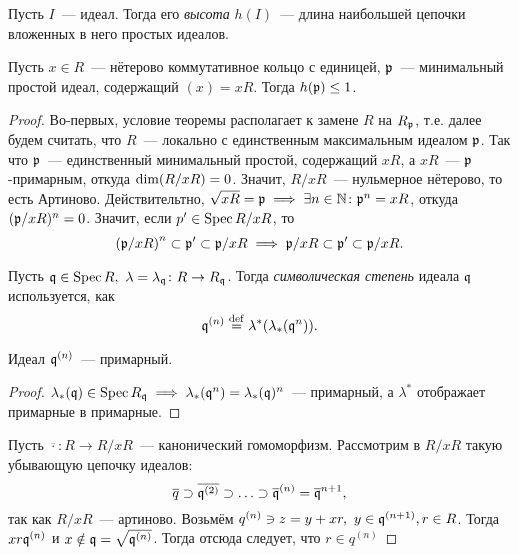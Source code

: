 	\begin{definition} 
		Пусть $I$~--- идеал. Тогда  его \emph{высота} $h(I)$~--- длина наибольшей цепочки вложенных в него простых идеалов. 
	\end{definition}

	\begin{theorem}
	 	Пусть $x \in R$~--- нётерово коммутативное кольцо с единицей, $\fp$~--- минимальный простой идеал, содержащий $(x) = xR$. Тогда $h(\fp) \le 1$. 	 
	 \end{theorem}  
	 \begin{proof}
	 	Во-первых, условие теоремы располагает к замене $R$ на $R_{\fp}$, т.е. далее будем считать, что $R$~--- локально с единственным максимальным идеалом $\fp$. Так что $\fp$~--- единственный минимальный простой, содержащий $xR$, а $xR$~--- $\fp$-примарным, откуда $\dim\lr*{R/xR} = 0$. Значит, $R/xR$~--- нульмерное нётерово, то есть Артиново. Действительтно, $\sqrt{xR} = \fp \implies \exists n \in \N \colon \fp^n = xR$, откуда $(\fp/xR)^n = 0$. Значит, если $p' \in \Spec{R/xR}$, то 
	 	\[
	 		\lr*{\fp/xR}^n \subset \fp' \subset \fp/xR \implies \fp/xR \subset \fp' \subset \fp/xR.
	 	\]

	 	\begin{definition} 
	 		Пусть $\fq \in \Spec{R}, \ \lambda = \lambda_{\fq}\colon R \to R_{\fq}$. Тогда \emph{символическая степень} идеала $\fq$ используется, как 
	 		\[
	 			\fq^{(n)} \eqdef \lambda^*\lr*{\lambda_*(\fq^n)}.
	 		\]
	 	\end{definition}

	 	\begin{lemma} 
	 		Идеал $\fq^{(n)}$~--- примарный. 
	 	\end{lemma}

	 	\begin{proof}
	 		$\lambda_{*}(\fq) \in \Spec{R_{\fq}} \implies \lambda_{*}(\fq^n) = \lambda_{*}(\fq)^n$~--- примарный, а $\lambda^*$ отображает примарные в примарные.  
	 	\end{proof}

	 	Пусть $\overline{\cdot}\colon R \to R/xR$~--- канонический гомоморфизм. Рассмотрим в $R/xR$ такую убывающую цепочку идеалов: 
	 	\[
	 		\overline{q} \supset \overline{\fq^{(2)}} \supset \ldots \supset \overline{\fq}^{(n)} = \overline{\fq}^{n + 1},
	 	\]
	 	так как $R/xR$~--- артиново. Возьмём $q^{(n)} \ni z = y + xr, \ y \in \fq^{(n + 1)}, r \in R$. Тогда $xr \fq^{(n)}$ и $x \notin \fq = \sqrt{\fq^{(n)}}$. Тогда отсюда следует, что $r \in q^{(n)}$



\end{proof}
